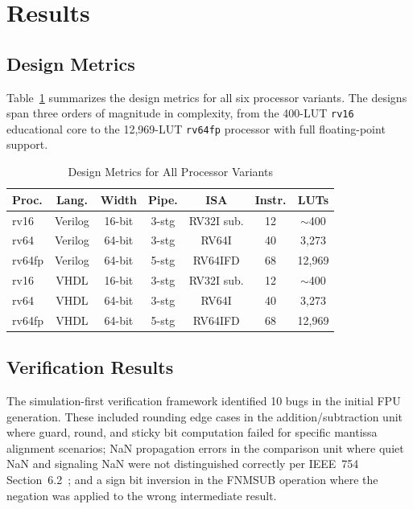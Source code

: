 \documentclass[journal]{IEEEtran}
\begin{document}
\section{Results}
\label{sec:results}

\subsection{Design Metrics}
\label{sec:metrics}

Table~\ref{tab:metrics} summarizes the design metrics for all six
processor variants.  The designs span three orders of magnitude in
complexity, from the 400-LUT \texttt{rv16} educational core to the
12,969-LUT \texttt{rv64fp} processor with full floating-point support.

\begin{table}[!t]
\centering
\caption{Design Metrics for All Processor Variants}
\label{tab:metrics}
\renewcommand{\arraystretch}{1.15}
\footnotesize
\begin{tabular}{lcccccc}
\toprule
\textbf{Proc.} & \textbf{Lang.} & \textbf{Width} & \textbf{Pipe.}
  & \textbf{ISA} & \textbf{Instr.} & \textbf{LUTs} \\
\midrule
rv16   & Verilog & 16-bit & 3-stg & RV32I sub. & 12 & $\sim$400 \\
rv64   & Verilog & 64-bit & 3-stg & RV64I      & 40 & 3,273 \\
rv64fp & Verilog & 64-bit & 5-stg & RV64IFD    & 68 & 12,969 \\
rv16   & VHDL    & 16-bit & 3-stg & RV32I sub. & 12 & $\sim$400 \\
rv64   & VHDL    & 64-bit & 3-stg & RV64I      & 40 & 3,273 \\
rv64fp & VHDL    & 64-bit & 5-stg & RV64IFD    & 68 & 12,969 \\
\bottomrule
\end{tabular}
\end{table}

\subsection{Verification Results}
\label{sec:verification}

The simulation-first verification framework identified 10 bugs in the
initial FPU generation.  These included rounding edge cases in the
addition/subtraction unit where guard, round, and sticky bit computation
failed for specific mantissa alignment scenarios; NaN propagation errors
in the comparison unit where quiet NaN and signaling NaN were not
distinguished correctly per IEEE~754 Section~6.2~\cite{ieee754_2019}; and
a sign bit inversion in the FNMSUB operation where the negation was
applied to the wrong intermediate result.
\end{document}
